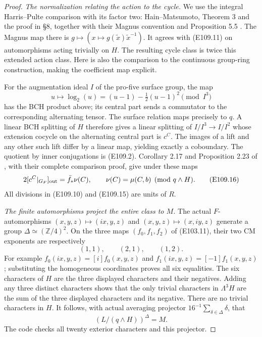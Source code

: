 \begin{proof}
\emph{The normalization relating the action to the cycle.}
We use the integral Harris--Pulte comparison with its factor two:
Hain--Matsumoto, Theorem 3 and the proof in \S8, together with
their Magnus convention and Proposition 5.5
\cite{E109_HainMatsumoto}.  The Magnus map there is
$g\mapsto(x\mapsto g(\widetilde x)\widetilde x^{-1})$.
It agrees with (E109.11) on automorphisms acting trivially on $H$.
The resulting cycle class is twice this extended action class.
Here is also the comparison to the continuous group-ring
construction, making the coefficient map explicit.

For the augmentation ideal $I$ of the pro-five surface group,
the map
\[
        u\longmapsto \log_2(u)
           =(u-1)-\tfrac12(u-1)^2\pmod{I^3}
 \tag{E109.15}
\]
has the BCH product above; its central part sends a commutator
to the corresponding alternating tensor.  The surface relation
maps precisely to $q$.  A linear BCH splitting of $H$ therefore
gives a linear splitting of $I/I^3\to I/I^2$ whose extension
cocycle on the alternating central part is $c^C$.
The images of a lift and any other such lift differ by a linear
map, yielding exactly a coboundary.  The quotient by inner
conjugations is (E109.2).  Corollary 2.17 and Proposition 2.23
of \cite{E109_BisognoLiLittSrinivasan}, with their complete
comparison proof, give under these maps
\[
             2[c^C|_{G_F}]_{\rm out}
                =\bar f_*\nu(C),\qquad
  \nu(C)=\mu(C,b)\pmod{q\wedge H}.
 \tag{E109.16}
\]
All divisions in (E109.10) and (E109.15) are units of $R$.

\emph{The finite automorphisms project the entire class to $M$.}
The actual $F$-automorphisms
$(x,y,z)\mapsto(ix,y,z)$ and $(x,y,z)\mapsto(x,iy,z)$
generate a group $\Delta\simeq(\mathbb Z/4)^2$.
On the three maps $(f_0,f_1,f_2)$ of (E103.11), their two
CM exponents are respectively
\[
               (1,1),\qquad(2,1),\qquad(1,2).
 \tag{E109.17}
\]
For example $f_0(ix,y,z)=[i]f_0(x,y,z)$ and
$f_1(ix,y,z)=[-1]f_1(x,y,z)$; substituting the homogeneous
coordinates proves all six equalities.  The six characters of
$H$ are the three displayed characters and their negatives.
Adding any three distinct characters shows that the only
trivial characters in $\Lambda^3H$ are the sum of the three
displayed characters and its negative.  There are no trivial
characters in $H$.  It follows, with actual averaging projector
$16^{-1}\sum_{\delta\in\Delta}\delta$, that
\[
           (L/(q\wedge H))^\Delta=M.
 \tag{E109.18}
\]
The code checks all twenty exterior characters and this projector.


\end{proof}
